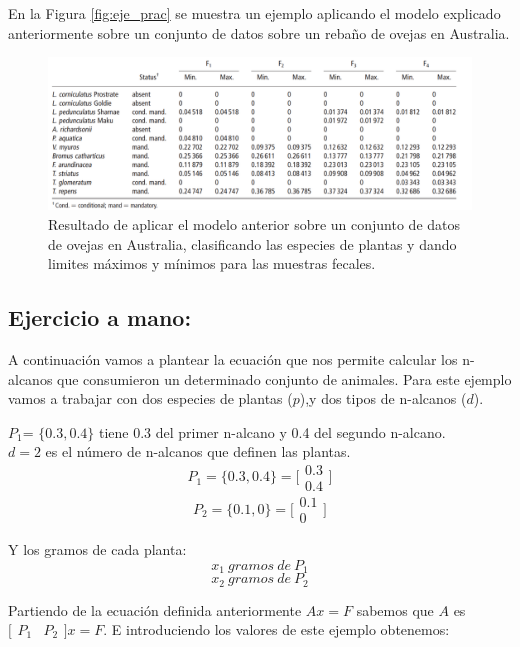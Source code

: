 \documentclass[11pt]{article}
\begin{document}
En la Figura \ref{fig:eje_prac} se muestra un ejemplo aplicando el modelo explicado anteriormente sobre un conjunto de datos sobre un rebaño de ovejas en Australia.

\begin{figure}[h!] 
\centering
    \includegraphics[width=1\textwidth]{resultados_ovejas.png}
\caption{Resultado de aplicar el modelo anterior sobre un conjunto de datos de ovejas en Australia, clasificando las especies de plantas y dando limites máximos y mínimos para las muestras fecales.}
\label{fig:res_ovej}
\end{figure}

\subsection{Ejercicio a mano:}
A continuación vamos a plantear la ecuación que nos permite calcular los n-alcanos que consumieron un determinado conjunto de animales. Para este ejemplo vamos a trabajar con dos especies de plantas ($p$),y dos tipos de n-alcanos ($d$).

$P_1$= $\{0.3,0.4\}$ tiene 0.3 del primer n-alcano y 0.4 del segundo n-alcano. \\
$d=2$ es el número de n-alcanos que definen las plantas.
\Large
$$P_1 = \{ 0.3 , 0.4 \} = \bigl[\begin{smallmatrix} 0.3\\ 0.4\end{smallmatrix}\bigr]$$
$$P_2 = \{ 0.1 , 0 \} = \bigl[\begin{smallmatrix} 0.1\\ 0\end{smallmatrix}\bigr]$$
\normalsize

Y los gramos de cada planta:
$$x_1\:gramos\:de\:P_1$$
$$x_2\:gramos\:de\:P_2$$


Partiendo de la ecuación definida anteriormente $Ax=F$ sabemos que $A$ es $\bigl[\begin{smallmatrix} P_1 & P_2\end{smallmatrix}\bigr]x=F$. E introduciendo los valores de este ejemplo obtenemos:
\end{document}
